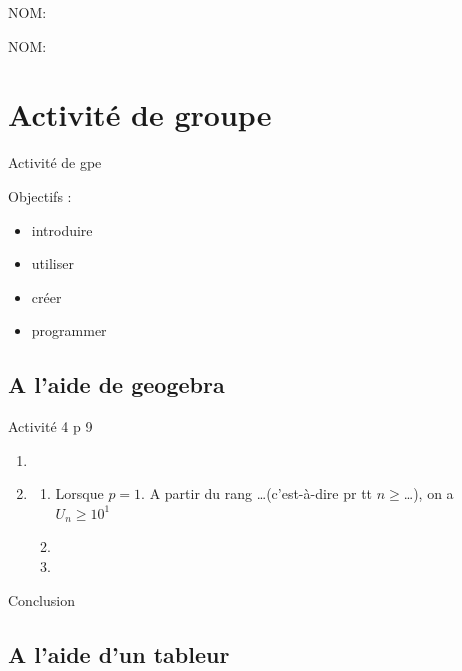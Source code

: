 \documentclass[12pt,frenchb]{book}
\begin{document}
NOM:

NOM:
\chapter{Activité de groupe}

\begin{center}
Activité de gpe
\end{center}
Objectifs :
\parbox[t]{0.8\linewidth}{
\begin{itemize}
\item introduire
\item utiliser
\item créer
\item programmer
\end{itemize}}

\section{A l'aide de geogebra}

Activité 4 p 9 
\begin{enumerate}
\item \dotfill
\item
\begin{enumerate}
\item Lorsque $p=1$. A partir du rang \ldots (c'est-à-dire pr tt $n\geqslant$\ldots), on a $U_{n}\geqslant10^{1}$
\item \dotfill
\item \dotfill
\end{enumerate}
\end{enumerate}
\medskip
Conclusion


\dotfill

\dotfill 

\dotfill

\section{A l'aide d'un tableur}
\end{document}
